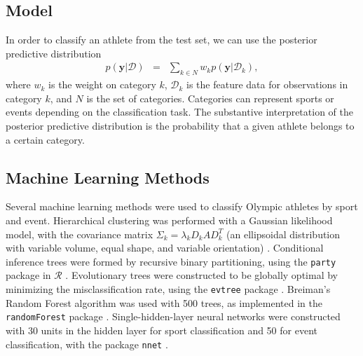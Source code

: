 \documentclass[12pt,letterpaper]{article} %
\begin{document}



\subsection{Model}



In order to classify an athlete from the test set, we can use the posterior predictive distribution
\begin{eqnarray*}
p(\mathbf{y}|\mathcal{D}) &=& \sum_{k \in N} w_k p(\mathbf{y}|\mathcal{D}_k),
\end{eqnarray*}
where $w_k$ is the weight on category $k$, $\mathcal{D}_k$ is the feature data for observations in category $k$, and $N$ is the set of categories. Categories can represent sports or events depending on the classification task. The substantive interpretation of the posterior predictive distribution is the probability that a given athlete belongs to a certain category.




\subsection{Machine Learning Methods}


Several machine learning methods were used to classify Olympic athletes by sport and event. Hierarchical clustering was performed with a Gaussian likelihood model, with the covariance matrix $\Sigma_k=\lambda_k D_k A D_k^T$ (an ellipsoidal distribution with variable volume, equal shape, and variable orientation) \citep{heller2005bayesian,fraley2012mclust}. Conditional inference trees were formed by recursive binary partitioning, using the \texttt{party} package in $\mathcal{R}$ \citep{hothorn2006unbiased,hothorn2010party}. Evolutionary trees were constructed to be globally optimal by minimizing the misclassification rate, using the \texttt{evtree} package \citep{grubinger2011evtree}. Breiman's Random Forest algorithm was used with 500 trees, as implemented in the \texttt{randomForest} package \citep{liaw2002classification}. Single-hidden-layer neural networks were constructed with 30 units in the hidden layer for sport classification and 50 for event classification, with the package \texttt{nnet} \citep{venables2002modern}.
\end{document}
